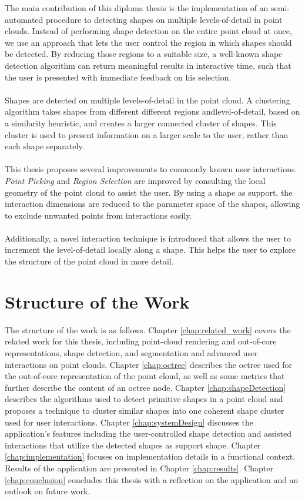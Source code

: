 The main contribution of this diploma thesis is the implementation of an semi-automated procedure to detecting shapes on multiple levels-of-detail in point clouds. Instead of performing shape detection on the entire point cloud at once, we use an approach that lets the user control the region in which shapes should be detected. By reducing those regions to a suitable size, a well-known shape detection algorithm can return meaningful results in interactive time, such that the user is presented with immediate feedback on his selection. 
\\
\\
Shapes are detected on multiple levels-of-detail in the point cloud. A clustering algorithm takes shapes from different different regions andlevel-of-detail, based on a similarity heuristic, and creates a larger connected cluster of shapes. This cluster is used to present information on a larger scale to the user, rather than each shape separately. 
\\
\\ 
This thesis proposes several improvements to commonly known user interactions. \textit{Point Picking} and \textit{Region Selection} are improved by consulting the local geometry of the point cloud to assist the user. By using a shape as support, the interaction dimensions are reduced to the parameter space of the shapes, allowing to exclude unwanted points from interactions easily. 
\\
\\
Additionally,  a novel interaction technique is introduced that allows the user to increment the level-of-detail locally along a shape. This helps the user to explore the structure of the point cloud in more detail. 


\section{Structure of the Work}

The structure of the work is as follows. Chapter \ref{chap:related_work} covers the related work for this thesis, including point-cloud rendering and out-of-core representations, shape detection, and segmentation and advanced user interactions on point clouds. Chapter \ref{chap:octree} describes the octree used for the out-of-core representation of the point cloud, as well as some metrics that further describe the content of an octree node. Chapter \ref{chap:shapeDetection} describes the algorithms used to detect primitive shapes in a point cloud and proposes a technique to cluster similar shapes into one coherent shape cluster used for user interactions. Chapter \ref{chap:systemDesign} discusses the application's features including the user-controlled shape detection and assisted interactions that utilize the detected shapes as support shape. Chapter \ref{chap:implementation} focuses on implementation details in a functional context. Results of the application are presented in Chapter \ref{chap:results}. Chapter \ref{chap:conclusion} concludes this thesis with a reflection on the application and an outlook on future work. 

